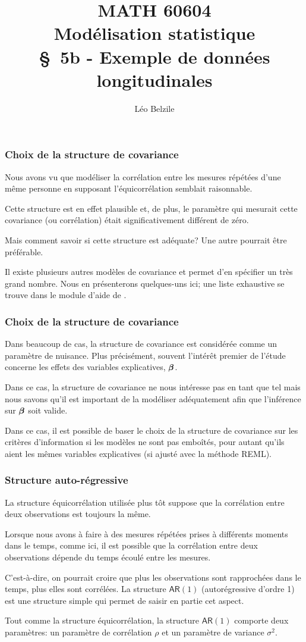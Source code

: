 \documentclass{beamer}
\title[\color{white}{MATH 60604 \S~5b - Exemple de données longitudinales}]{\texorpdfstring{MATH 60604 \\Modélisation statistique \\ \S~5b - Exemple de données longitudinales}{MATH 60604 \\Modélisation statistique \\ \S~5b - Exemple de données longitudinales}}
\author{Léo Belzile}
\institute{HEC Montréal\\
Département de sciences de la décision}
\date{}
\begin{document}
\frame{\titlepage}

\begin{frame}
\frametitle{Choix de la structure de covariance}
\bi
\item Nous avons vu que modéliser la corrélation entre les
mesures répétées d'une même personne en supposant l'équicorrélation semblait raisonnable. 
\item Cette structure est en effet
plausible et, de plus, le paramètre qui mesurait cette covariance (ou
corrélation) était significativement différent de zéro. 
\item Mais comment savoir si cette structure est adéquate? Une autre pourrait être préférable.
\item Il existe plusieurs autres modèles de covariance et \SASlang{} permet d'en spécifier
un très grand nombre. Nous en présenterons quelques-uns ici; une liste
exhaustive se trouve dans le module d'aide de \SASlang{}.
\ei
\end{frame}

\begin{frame}
\frametitle{Choix de la structure de covariance}
\bi
\item Dans beaucoup de cas, la structure de covariance est considérée comme un
paramètre de nuisance. Plus précisément, souvent l'intérêt premier de l'étude
concerne les effets des variables explicatives, $\boldsymbol {\beta}$. 
\item Dans ce cas, la structure
de covariance ne nous intéresse pas en tant que tel mais nous savons qu'il est
important de la modéliser adéquatement afin que l'inférence sur $\boldsymbol {\beta}$ soit
valide. 
\item Dans ce cas, il est possible de baser le choix de la structure de
covariance sur les critères d'information si les modèles ne sont pas emboîtés, pour autant qu'ils aient les mêmes variables explicatives (si ajusté avec la méthode REML).
\ei
\end{frame}

\begin{frame}
\frametitle{Structure auto-régressive}
\bi
\item La structure équicorrélation utilisée plus tôt suppose que la corrélation
entre deux observations est toujours la même. 
\item Lorsque nous avons à faire à
des mesures répétées prises à différents moments dans le temps, comme ici, 
il est possible que la corrélation entre deux observations dépende du temps
écoulé entre les mesures. 
\item C'est-à-dire, on pourrait croire que plus les
observations sont rapprochées dans le temps, plus elles sont corrélées. La
structure \alert{$\mathsf{AR}(1)$} (\alert{autorégressive d'ordre 1}) est une structure simple qui permet
de saisir en partie cet aspect. 
\item Tout comme la structure équicorrélation, la
structure $\mathsf{AR}(1)$ comporte deux paramètres: un paramètre de corrélation $\rho$ et
un paramètre de variance $\sigma^2$.
\ei
\end{frame}
\end{document}
